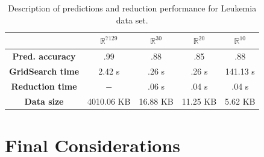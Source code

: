 \documentclass[12pt]{article}
\begin{document}
\begin{table}[H]
	\centering
	\begin{tabular}{|c|c|c|c|c|}
		\hline
		& \textbf{$\mathbb{R}^{7129}$} & \textbf{$\mathbb{R}^{30}$} & \textbf{$\mathbb{R}^{20}$} & \textbf{$\mathbb{R}^{10}$} \\\hline
		\textbf{Pred. accuracy}    & .99 & .88 & .85 & .88 \\\hline
		\textbf{GridSearch time}   & 2.42 s & .26 s & .26 s & 141.13 s \\\hline
		\textbf{Reduction time}    & $-$ & .06 s & .04 s & .04 s \\\hline
		\textbf{Data size}         & 4010.06 KB & 16.88 KB & 11.25 KB & 5.62 KB \\\hline
	\end{tabular}
	\captionsetup{justification=centering}	
	\caption{Description of predictions and reduction performance for Leukemia data set.}
\end{table}

\section{Final Considerations}

\newpage



\end{document}
